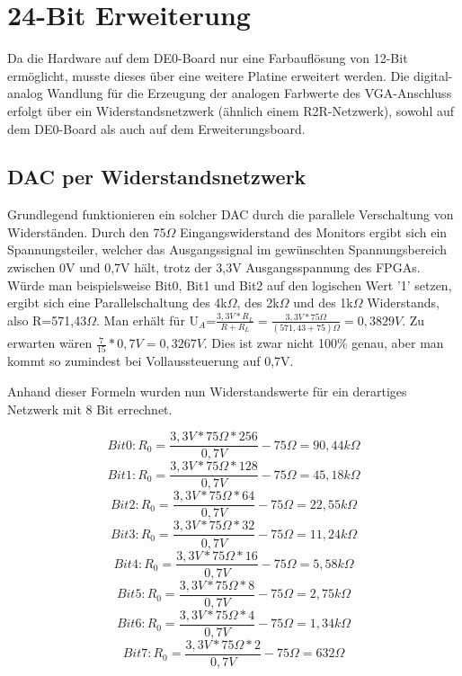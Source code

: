 \chapter{24-Bit Erweiterung}
\label{cha:24bit}

Da die Hardware auf dem DE0-Board nur eine Farbauflösung von 12-Bit ermöglicht, musste dieses über eine weitere Platine erweitert werden. Die digital-analog Wandlung für die Erzeugung der analogen Farbwerte des VGA-Anschluss erfolgt über ein Widerstandsnetzwerk (ähnlich einem R2R-Netzwerk), sowohl auf dem DE0-Board als auch auf dem Erweiterungsboard.
\section{DAC per Widerstandsnetzwerk}
Grundlegend funktionieren ein solcher DAC durch die parallele Verschaltung von Widerständen. Durch den 75$\Omega$ Eingangswiderstand des Monitors ergibt sich ein Spannungsteiler, welcher das Ausgangssignal im gewünschten Spannungsbereich zwischen 0V und 0,7V hält, trotz der 3,3V Ausgangsspannung des FPGAs. Würde man beispielsweise Bit0, Bit1 und Bit2 auf den logischen Wert '1' setzen, ergibt sich eine Parallelschaltung des 4k$\Omega$, des 2k$\Omega$ und des 1k$\Omega$ Widerstands, also R=571,43$\Omega$. Man erhält für U$_{A}$=$\frac{3,3V*R_L}{R+R_L}=\frac{3,3V*75\Omega}{(571,43+75)\Omega}=0,3829V$. Zu erwarten wären $\frac{7}{15}*0,7V=0,3267V$. Dies ist zwar nicht 100\% genau, aber man kommt so zumindest bei Vollaussteuerung auf 0,7V.

Anhand dieser Formeln wurden nun Widerstandswerte für ein derartiges Netzwerk mit 8 Bit errechnet.

\begin{equation}
Bit0: R_0=\frac{3,3V*75\Omega*256}{0,7V}-75\Omega=90,44k\Omega
\end{equation}
\begin{equation}
Bit1: R_0=\frac{3,3V*75\Omega*128}{0,7V}-75\Omega=45,18k\Omega
\end{equation}
\begin{equation}
Bit2: R_0=\frac{3,3V*75\Omega*64}{0,7V}-75\Omega=22,55k\Omega
\end{equation}
\begin{equation}
Bit3: R_0=\frac{3,3V*75\Omega*32}{0,7V}-75\Omega=11,24k\Omega
\end{equation}
\begin{equation}
Bit4: R_0=\frac{3,3V*75\Omega*16}{0,7V}-75\Omega=5,58k\Omega
\end{equation}
\begin{equation}
Bit5: R_0=\frac{3,3V*75\Omega*8}{0,7V}-75\Omega=2,75k\Omega
\end{equation}
\begin{equation}
Bit6: R_0=\frac{3,3V*75\Omega*4}{0,7V}-75\Omega=1,34k\Omega
\end{equation}
\begin{equation}
Bit7: R_0=\frac{3,3V*75\Omega*2}{0,7V}-75\Omega=632\Omega
\end{equation}

